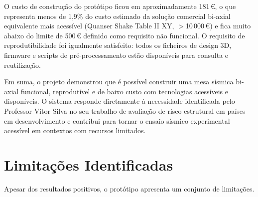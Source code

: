 O custo de construção do protótipo ficou em aproximadamente 181\,\euro{}, o que representa menos de 1,9\% do custo estimado da solução comercial bi-axial equivalente mais acessível (Quanser Shake Table II XY, $>$10\,000\,\euro{}) e fica muito abaixo do limite de 500\,\euro{} definido como requisito não funcional. O requisito de reprodutibilidade foi igualmente satisfeito: todos os ficheiros de design 3D, firmware e scripts de pré-processamento estão disponíveis para consulta e reutilização.

Em suma, o projeto demonstrou que é possível construir uma mesa sísmica bi-axial funcional, reprodutível e de baixo custo com tecnologias acessíveis e disponíveis. O sistema responde diretamente à necessidade identificada pelo Professor Vítor Silva no seu trabalho de avaliação de risco estrutural em países em desenvolvimento e contribui para tornar o ensaio sísmico experimental acessível em contextos com recursos limitados.


\section{Limitações Identificadas}
\label{sec:limitacoes}

Apesar dos resultados positivos, o protótipo apresenta um conjunto de limitações.

